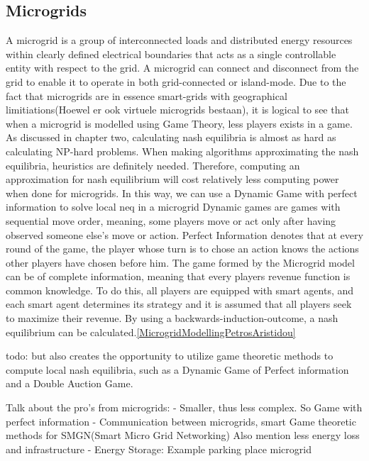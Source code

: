 \subsection{Microgrids}
A microgrid is a group of interconnected loads and distributed energy resources within clearly defined electrical boundaries that acts as a single controllable entity with respect to the grid. A microgrid can connect and disconnect from the grid to enable it to operate in both grid-connected or island-mode.
Due to the fact that microgrids are in essence smart-grids with geographical limitiations(Hoewel er ook virtuele microgrids bestaan), it is logical to see that when a microgrid is modelled using Game Theory, less players exists in a game. As discussed in chapter two, calculating nash equilibria is almost as hard as calculating NP-hard problems. When making algorithms approximating the nash equilibria, heuristics are definitely needed. Therefore, computing an approximation for nash equilibrium will cost relatively less computing power when done for microgrids. In this way, we can use a Dynamic Game with perfect information to solve local \ac{neq} in a microgrid
Dynamic games are games with sequential move order, meaning, some players move or act only after having observed someone else’s move or action. Perfect Information denotes that at every round of the game, the player whose turn is to chose an action knows the actions other players have chosen before him. The game formed by the Microgrid model can be of complete information, meaning that every players revenue function is common knowledge.
To do this, all players are equipped with smart agents, and each smart agent determines its strategy and it is assumed that all players seek to maximize their revenue. By using a backwards-induction-outcome, a nash equilibrium can be calculated.\ref{MicrogridModellingPetrosAristidou}

todo: 
but also creates the opportunity to utilize game theoretic methods to compute local nash equilibria, such as a Dynamic Game of Perfect information and a Double Auction Game.


Talk about the pro's from microgrids:
 - Smaller, thus less complex. So Game with perfect information
 - Communication between microgrids, smart Game theoretic methods for SMGN(Smart Micro Grid Networking) Also mention less energy loss and infrastructure
 - Energy Storage: Example parking place microgrid






